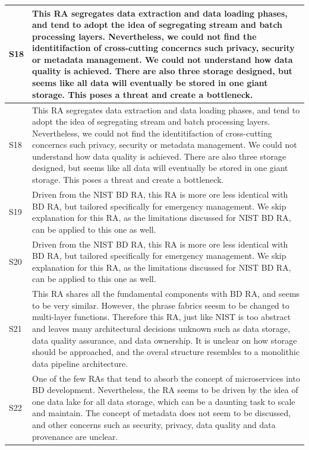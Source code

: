 \documentclass[review]{elsarticle}
\begin{document}
\begin{longtable}{|p{0.5cm}|p{11cm}|}
        \hline
        S18 & This RA segregates data extraction and data loading phases, and tend to adopt the idea of segregating stream and batch processing layers. Nevertheless, we could not find the identitifaction of cross-cutting concerncs such privacy, security or metadata management. We could not understand how data quality is achieved. There are also three storage designed, but seems like all data will eventually be stored in one giant storage. This poses a threat and create a bottleneck. \\
        \hline
        S18 & This RA segregates data extraction and data loading phases, and tend to adopt the idea of segregating stream and batch processing layers. Nevertheless, we could not find the identitifaction of cross-cutting concerncs such privacy, security or metadata management. We could not understand how data quality is achieved. There are also three storage designed, but seems like all data will eventually be stored in one giant storage. This poses a threat and create a bottleneck. \\
        \hline
        S19 & Driven from the NIST BD RA, this RA is more ore less identical with BD RA, but tailored specifically for emergency management. We skip explanation for this RA, as the limitations discussed for NIST BD RA, can be applied to this one as well. \\
        \hline
        S20 & Driven from the NIST BD RA, this RA is more ore less identical with BD RA, but tailored specifically for emergency management. We skip explanation for this RA, as the limitations discussed for NIST BD RA, can be applied to this one as well. \\
        \hline
        S21 & This RA shares all the fundamental components with BD RA, and seems to be very similar. However, the phrase fabrics seesm to be changed to multi-layer functions. Therefore this RA, just like NIST is too abstract and leaves many architectural decisions unknown such as data storage, data quality assurance, and data ownership. It is unclear on how storage should be approached, and the overal structure resembles to a monolithic data pipeline architecture. \\
        \hline
        S22 & One of the few RAs that tend to absorb the concept of microservices into BD development. Nevertheless, the RA seems to be driven by the idea of one data lake for all data storage, which can be a daunting task to scale and maintain. The concept of metadata does not seem to be discussed, and other concerns such as security, privacy, data quality and data provenance are unclear.  \\

\end{longtable}
\end{document}
